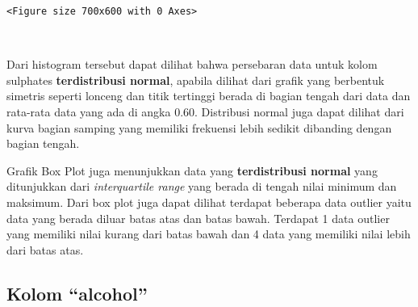 \documentclass[11pt]{article}
\begin{document}
    
    \begin{Verbatim}[commandchars=\\\{\}]
<Figure size 700x600 with 0 Axes>
    \end{Verbatim}

    
    \begin{center}
    \end{center}
    { \hspace*{\fill} \\}
    
    Dari histogram tersebut dapat dilihat bahwa persebaran data untuk kolom
sulphates \textbf{terdistribusi normal}, apabila dilihat dari grafik
yang berbentuk simetris seperti lonceng dan titik tertinggi berada di
bagian tengah dari data dan rata-rata data yang ada di angka 0.60.
Distribusi normal juga dapat dilihat dari kurva bagian samping yang
memiliki frekuensi lebih sedikit dibanding dengan bagian tengah.

Grafik Box Plot juga menunjukkan data yang \textbf{terdistribusi normal}
yang ditunjukkan dari \emph{interquartile range} yang berada di tengah
nilai minimum dan maksimum. Dari box plot juga dapat dilihat terdapat
beberapa data outlier yaitu data yang berada diluar batas atas dan batas
bawah. Terdapat 1 data outlier yang memiliki nilai kurang dari batas
bawah dan 4 data yang memiliki nilai lebih dari batas atas.

    \hypertarget{kolom-alcohol}{%
\subsection{Kolom ``alcohol''}\label{kolom-alcohol}}
\end{document}
